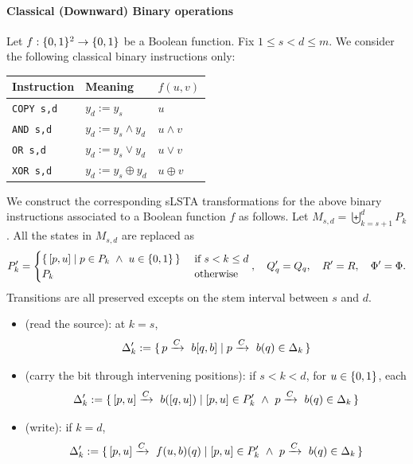 \documentclass{article}
\begin{document}
\paragraph{Classical (Downward) Binary operations}
Let $f: \{0,1\}^2 \to \{0,1\}$ be a Boolean function. Fix $1 \leq s < d \leq m$. We consider the following classical binary instructions only:
\begin{center}\begin{tabular}{@{}lll@{}}
\hline
Instruction & Meaning & \(f(u,v)\) \\
\hline

\texttt{COPY\ s,d} & \(y_d:=y_s\) & \(u\) \\
\texttt{AND\ s,d} & \(y_d:=y_s\land y_d\) & \(u\land v\) \\
\texttt{OR\ s,d} & \(y_d:=y_s\lor y_d\) & \(u\lor v\) \\
\texttt{XOR\ s,d} & \(y_d:=y_s\oplus y_d\) & \(u\oplus v\) \\
\hline 
\end{tabular}\end{center}
We construct the corresponding sLSTA transformations for the above binary instructions associated to a Boolean function $f$ as follows.
Let $M_{s,d} = \biguplus_{k=s+1}^d P_k$. All the states in $M_{s,d}$ are replaced as
\begin{equation*}
P'_k = \begin{cases}
\set{[p,u] \mid p \in P_k\  \land\ u \in \{0,1\}} &\text{ if } s < k \leq d \\
P_k &\text{ otherwise}
\end{cases}, \quad Q'_q =Q_q, \quad R'=R, \quad \Phi' = \Phi.
\end{equation*}
Transitions are all preserved excepts on the stem interval between $s$ and $d$.
\begin{itemize}
\item (read the source): at $k=s$, 
\begin{equation*}
\Delta'_k := \set{{p}\xrightarrow{C}~{b[q,b]} \mid  {p}\xrightarrow{C}~{b(q)} \in \Delta_k}
\end{equation*}
\item (carry the bit through intervening positions): if $s < k < d$, for $u \in \{0,1\}$, each
\begin{equation*}
\Delta'_k := \set{ {[p,u]}\xrightarrow{C}~{b([q,u])} \mid [p,u] \in P'_k\ \land\ {p}\xrightarrow{C}~{b(q)} \in \Delta_k }
\end{equation*}
\item (write): if $k=d$,
\begin{equation*}
\Delta'_k:= \set{ \transtree{[p,u]}{C}{f(u,b)(q)} \mid [p,u] \in P'_k \ \land \ \transtree{p}{C}{b(q)} \in \Delta_k}
\end{equation*}
\end{itemize}
\end{document}
